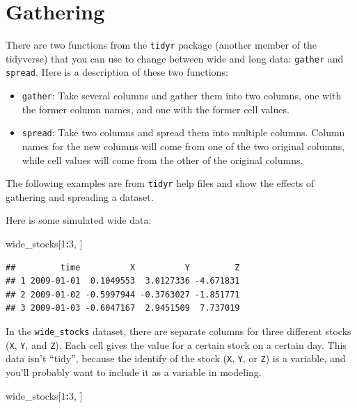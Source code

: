 \documentclass[]{book}
\makeatletter
\newenvironment{Shaded}{\begin{snugshade}}{\end{snugshade}}
\newcommand{\DecValTok}[1]{\textcolor[rgb]{0.00,0.00,0.81}{#1}}
\newcommand{\OperatorTok}[1]{\textcolor[rgb]{0.81,0.36,0.00}{\textbf{#1}}}
\newcommand{\NormalTok}[1]{#1}
\providecommand{\tightlist}{%
  \setlength{\itemsep}{0pt}\setlength{\parskip}{0pt}}
\newenvironment{kframe}{%
\medskip{}
\setlength{\fboxsep}{.8em}
 \def\at@end@of@kframe{}%
 \ifinner\ifhmode%
  \def\at@end@of@kframe{\end{minipage}}%
  \begin{minipage}{\columnwidth}%
 \fi\fi%
 \def\FrameCommand##1{\hskip\@totalleftmargin \hskip-\fboxsep
 \colorbox{shadecolor}{##1}\hskip-\fboxsep
     \hskip-\linewidth \hskip-\@totalleftmargin \hskip\columnwidth}%
 \MakeFramed {\advance\hsize-\width
   \@totalleftmargin\z@ \linewidth\hsize
   \@setminipage}}%
 {\par\unskip\endMakeFramed%
 \at@end@of@kframe}
\renewenvironment{Shaded}{\begin{kframe}}{\end{kframe}}
\theoremstyle{definition}
\theoremstyle{definition}
\theoremstyle{definition}
\theoremstyle{remark}
\makeatother
\begin{document}
\section{Gathering}\label{gathering}

There are two functions from the \texttt{tidyr} package (another member
of the tidyverse) that you can use to change between wide and long data:
\texttt{gather} and \texttt{spread}. Here is a description of these two
functions:

\begin{itemize}
\tightlist
\item
  \texttt{gather}: Take several columns and gather them into two
  columns, one with the former column names, and one with the former
  cell values.
\item
  \texttt{spread}: Take two columns and spread them into multiple
  columns. Column names for the new columns will come from one of the
  two original columns, while cell values will come from the other of
  the original columns.
\end{itemize}

The following examples are from \texttt{tidyr} help files and show the
effects of gathering and spreading a dataset.

Here is some simulated wide data:

\begin{Shaded}
\begin{Highlighting}[]
\NormalTok{wide_stocks[}\DecValTok{1}\OperatorTok{:}\DecValTok{3}\NormalTok{, ]}
\end{Highlighting}
\end{Shaded}

\begin{verbatim}
##         time          X          Y         Z
## 1 2009-01-01  0.1049553  3.0127336 -4.671831
## 2 2009-01-02 -0.5997944 -0.3763027 -1.851771
## 3 2009-01-03 -0.6047167  2.9451509  7.737019
\end{verbatim}

In the \texttt{wide\_stocks} dataset, there are separate columns for
three different stocks (\texttt{X}, \texttt{Y}, and \texttt{Z}). Each
cell gives the value for a certain stock on a certain day. This data
isn't ``tidy'', because the identify of the stock (\texttt{X},
\texttt{Y}, or \texttt{Z}) is a variable, and you'll probably want to
include it as a variable in modeling.

\begin{Shaded}
\begin{Highlighting}[]
\NormalTok{wide_stocks[}\DecValTok{1}\OperatorTok{:}\DecValTok{3}\NormalTok{, ]}
\end{Highlighting}
\end{Shaded}
\end{document}
